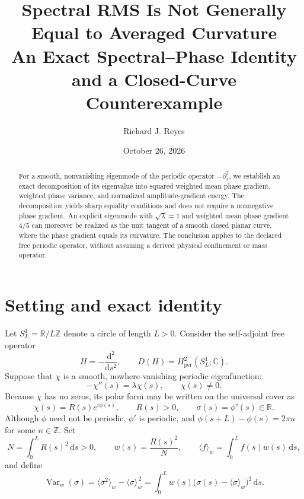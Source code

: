 \documentclass[11pt]{article}
\title{Spectral RMS Is Not Generally Equal to Averaged Curvature\\
\large An Exact Spectral--Phase Identity and a Closed-Curve Counterexample}
\author{Richard J. Reyes}
\date{October 26, 2026}
\newcommand{\dd}{\,\mathrm{d}}
\newcommand{\avg}[1]{\langle #1\rangle_w}
\newcommand{\Var}{\operatorname{Var}}
\begin{document}
\maketitle

\begin{abstract}
For a smooth, nonvanishing eigenmode of the periodic operator
$-\partial_s^2$, we establish an exact decomposition of its eigenvalue
into squared weighted mean phase gradient, weighted phase variance, and
normalized amplitude-gradient energy.  The decomposition yields sharp
equality conditions and does not require a nonnegative phase gradient.
An explicit eigenmode with $\sqrt{\lambda}=1$ and weighted mean phase
gradient $4/5$ can moreover be realized as the unit tangent of a smooth
closed planar curve, where the phase gradient equals its curvature.
The conclusion applies to the declared free periodic operator, without
assuming a derived physical confinement or mass operator.
\end{abstract}

\section{Setting and exact identity}

Let $S_L^1=\mathbb{R}/L\mathbb{Z}$ denote a circle of length $L>0$.
Consider the self-adjoint free operator
\begin{equation}
    H=-\frac{\mathrm{d}^2}{\mathrm{d}s^2},
    \qquad D(H)=H^2_{\mathrm{per}}(S_L^1;\mathbb{C}).
\end{equation}
Suppose that $\chi$ is a smooth, nowhere-vanishing periodic eigenfunction:
\begin{equation}\label{eq:eigenproblem}
    -\chi''(s)=\lambda\chi(s),\qquad \chi(s)\ne0.
\end{equation}
Because $\chi$ has no zeros, its polar form may be written on the
universal cover as
\begin{equation}\label{eq:polar}
    \chi(s)=R(s)e^{i\phi(s)},\qquad R(s)>0,\qquad
    \sigma(s)=\phi'(s)\in\mathbb{R}.
\end{equation}
Although $\phi$ need not be periodic, $\phi'$ is periodic, and
$\phi(s+L)-\phi(s)=2\pi n$ for some $n\in\mathbb{Z}$.
Set
\begin{equation}\label{eq:weights}
    N=\int_0^L R(s)^2\dd s>0,\qquad
    w(s)=\frac{R(s)^2}{N},\qquad
    \avg{f}=\int_0^L f(s)w(s)\dd s,
\end{equation}
and define
\begin{equation}
    \Var_w(\sigma)=\avg{\sigma^2}-\avg{\sigma}^{\,2}
    =\int_0^L w(s)\bigl(\sigma(s)-\avg{\sigma}\bigr)^2\dd s.
\end{equation}
\end{document}
